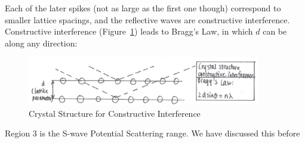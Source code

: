 \documentclass{school-22.101-notes}
\begin{document}
Each of the later spikes (not as large as the first one though) correspond to smaller lattice spacings, and the reflective waves are constructive interference. Constructive interference (Figure~\ref{constructive-interference}) leads to Bragg's Law, in which $d$ can be along any direction:
\begin{figure}
   \centering
   \includegraphics[width=4in]{images/ni/constructive-interference.png}
   \caption{Crystal Structure for Constructive Interference\label{constructive-interference}}
\end{figure}

Region 3 is the S-wave Potential Scattering range. We have discussed this before 
\end{document}
